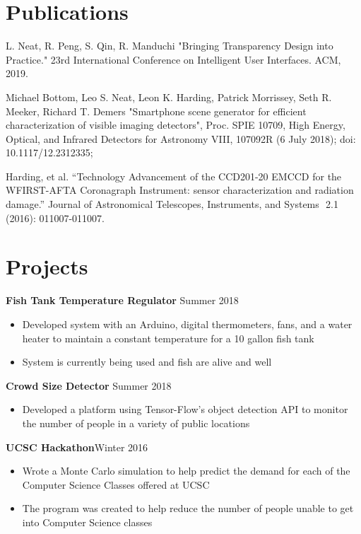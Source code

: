 \documentclass[mm,line]{res}
\begin{document}
\begin{resume}
\section{\sc Publications}
 L. Neat, R. Peng, S. Qin, R. Manduchi "Bringing Transparency Design into Practice." 23rd International Conference on Intelligent User Interfaces. ACM, 2019.

Michael Bottom, Leo S. Neat, Leon K. Harding, Patrick Morrissey, Seth R. Meeker, Richard T. Demers  "Smartphone scene generator for efficient characterization of visible imaging detectors", Proc. SPIE 10709, High Energy, Optical, and Infrared Detectors for Astronomy VIII, 107092R (6 July 2018); doi: 10.1117/12.2312335;

 Harding, et al.  ``Technology Advancement of the CCD201-20 EMCCD for the WFIRST-AFTA Coronagraph Instrument: sensor characterization and radiation damage.'' Journal of Astronomical Telescopes, Instruments,  and Systems 
	​ 2.1 (2016): 011007-011007. 
\section{\sc Projects}
{\bf Fish Tank Temperature Regulator } \hfill {Summer 2018}
\begin{itemize}
	\item Developed system with an Arduino, digital thermometers, fans, and a water heater to maintain a constant temperature for a 10 gallon fish tank
	\item System is currently being used and fish are alive and well
\end{itemize}
{\bf Crowd Size Detector } \hfill {Summer 2018}
\begin{itemize}
	\item Developed a platform using Tensor-Flow's object detection API to monitor the number of people in a variety of public locations 
\end{itemize}
{\bf UCSC Hackathon}\hfill {Winter 2016}
\begin{itemize}
\item Wrote a Monte Carlo simulation to help predict the demand for each of the Computer Science Classes offered at UCSC
\item The program was created to help reduce the number of people unable to get into Computer Science classes 
\end{itemize}



\end{resume}
\end{document}
